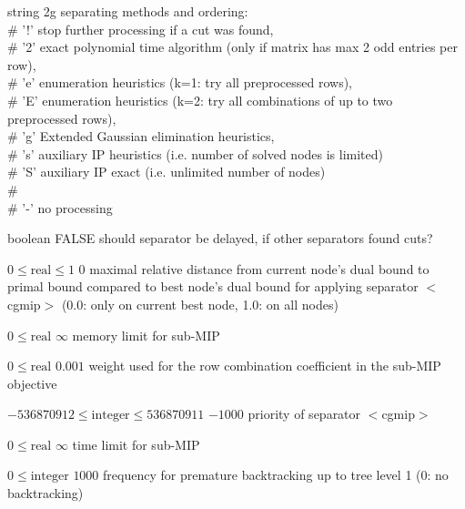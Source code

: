 %
{string}%
{2g}%
{separating methods and ordering:\\   \#                      '!' stop further processing if a cut was found,\\   \#                      '2' exact polynomial time algorithm (only if matrix has max 2 odd entries per row),\\   \#                      'e' enumeration heuristics (k=1: try all preprocessed rows),\\   \#                      'E' enumeration heuristics (k=2: try all combinations of up to two preprocessed rows),\\   \#                      'g' Extended Gaussian elimination heuristics,\\   \#                      's' auxiliary IP heuristics (i.e. number of solved nodes is limited)\\   \#                      'S' auxiliary IP exact      (i.e. unlimited number of nodes)\\   \#                      \\   \#                      '-' no processing}%
{}

%
{boolean}%
{FALSE}%
{should separator be delayed, if other separators found cuts?}%
{}

%
{$0\leq\textrm{real}\leq1$}%
{$0$}%
{maximal relative distance from current node's dual bound to primal bound compared to best node's dual bound for applying separator $<$cgmip$>$ (0.0: only on current best node, 1.0: on all nodes)}%
{}

%
{$0\leq\textrm{real}$}%
{$\infty$}%
{memory limit for sub-MIP}%
{}

%
{$0\leq\textrm{real}$}%
{$0.001$}%
{weight used for the row combination coefficient in the sub-MIP objective}%
{}

%
{$-536870912\leq\textrm{integer}\leq536870911$}%
{$-1000$}%
{priority of separator $<$cgmip$>$}%
{}

%
{$0\leq\textrm{real}$}%
{$\infty$}%
{time limit for sub-MIP}%
{}

%
{$0\leq\textrm{integer}$}%
{$1000$}%
{frequency for premature backtracking up to tree level 1 (0: no backtracking)}%
{}

